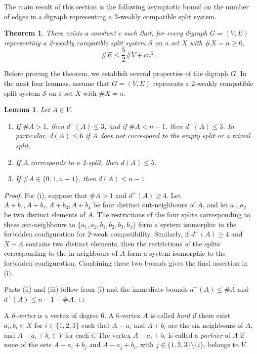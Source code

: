 \documentclass[11pt]{article}
\newtheorem{theorem}{Theorem}
\newtheorem{lemma}{Lemma}
\newcommand{\cS}{\mathcal{S}}
\begin{document}
	The main result of this section is the following asymptotic bound on the number of edges in a digraph representing a 2-weakly compatible split system.
	
	\begin{theorem}\label{thm:edge-bound}
		There exists a constant $c$ such that, for every digraph $G=(V,E)$ representing a 2-weakly compatible split system $\cS$ on a set $X$ with $\#X=n\ge 6$,
		\begin{equation}\label{eq:edge-bound}
			\#E\le \frac{5}{2}\#V+cn^2.
		\end{equation}
	\end{theorem}
	
	Before proving the theorem, we establish several properties of the digraph $G$. In the next four lemmas, assume that $G=(V,E)$ represents a 2-weakly compatible split system $\cS$ on a set $X$ with $\#X=n$.
	
	\begin{lemma}\label{lem:degree-bounds}
		Let $A\in V$.
		\begin{enumerate}[label=(\roman*)]
			\item If $\#A>1$, then $d^+(A)\le 3$, and if $\#A<n-1$, then $d^-(A)\le 3$. In particular, $d(A)\le 6$ if $A$ does not correspond to the empty split or a trivial split.
			\item If $A$ corresponds to a 2-split, then $d(A)\le 5$.
			\item If $\#A\in\{0,1,n-1\}$, then $d(A)\le n-1$.
		\end{enumerate}
	\end{lemma}
	
	\begin{proof}
		For (i), suppose that $\#A>1$ and $d^+(A)\ge 4$. Let $A+b_1,A+b_2,A+b_3,A+b_4$ be four distinct out-neighbours of $A$, and let $a_1,a_2$ be two distinct elements of $A$. The restrictions of the four splits corresponding to these out-neighbours to $\{a_1,a_2,b_1,b_2,b_3,b_4\}$ form a system isomorphic to the forbidden configuration for 2-weak compatibility. Similarly, if $d^-(A)\ge 4$ and $X-A$ contains two distinct elements, then the restrictions of the splits corresponding to the in-neighbours of $A$ form a system isomorphic to the forbidden configuration. Combining these two bounds gives the final assertion in (i).
		
		Parts (ii) and (iii) follow from (i) and the immediate bounds $d^-(A)\le\#A$ and $d^+(A)\le n-1-\#A$.
	\end{proof}
	
	A \emph{6-vertex} is a vertex of degree 6. A 6-vertex $A$ is called \emph{hard} if there exist $a_i,b_i\in X$ for $i\in\{1,2,3\}$ such that $A-a_i$ and $A+b_i$ are the six neighbours of $A$, and $A-a_i+b_i\in V$ for each $i$. The vertex $A-a_i+b_i$ is called a \emph{partner} of $A$ if none of the sets $A-a_i+b_j$ and $A-a_j+b_i$, with $j\in\{1,2,3\}\setminus\{i\}$, belongs to $V$.
	
\end{document}
